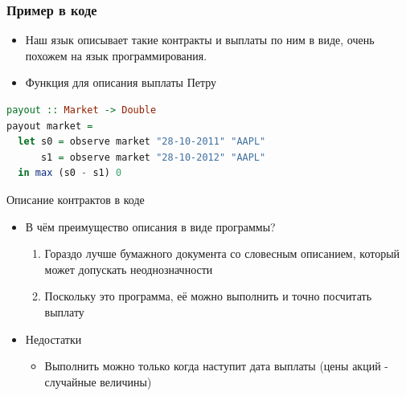 \documentclass{beamer}
\begin{document}
\begin{frame}[fragile]
\frametitle{Пример в коде}

\begin{itemize}
\item
  Наш язык описывает такие контракты и выплаты по ним в виде, очень
  похожем на язык программирования.
\item
  Функция для описания выплаты Петру
\end{itemize}

\begin{lstlisting}[language=Haskell]
payout :: Market -> Double
payout market = 
  let s0 = observe market "28-10-2011" "AAPL"
      s1 = observe market "28-10-2012" "AAPL"
  in max (s0 - s1) 0
\end{lstlisting}
\end{frame}

\begin{frame}{Описание контрактов в коде}

\begin{itemize}
\item
  В чём преимущество описания в виде программы?

  \begin{enumerate}[1.]
  \item
    Гораздо лучше бумажного документа со словесным описанием, который
    может допускать неоднозначности
  \item
    Поскольку это программа, её можно выполнить и точно посчитать
    выплату
  \end{enumerate}
\item
  Недостатки

  \begin{itemize}
  \item
    Выполнить можно только когда наступит дата выплаты (цены акций -
    случайные величины)
  \end{itemize}
\end{itemize}
\end{frame}
\end{document}
